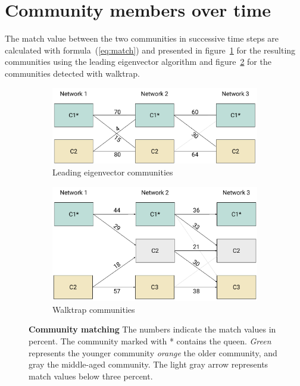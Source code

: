 \clearpage

\section{Community members over time}
The match value between the two communities in successive time steps are calculated with formula~(\ref{eq:match}) and presented in figure~\ref{fig:membersLE} for the resulting communities using the leading eigenvector algorithm and figure~\ref{fig:membersWT} for the communities detected with walktrap.

\begin{figure}[htb]
	\centering
	\begin{subfigure}[b]{1.0\textwidth}
	\centering
	\includegraphics[width=.8\textwidth]{Figures/membersLE}
	\caption[Leading eigenvector communities]{Leading eigenvector communities}
	\label{fig:membersLE}
	\vspace*{5mm}
	\end{subfigure} 
	\begin{subfigure}[b]{1.0\textwidth}
	\centering
	\includegraphics[width=.8\textwidth]{Figures/membersWT}
	\caption[Walktrap communities]{Walktrap communities}
	\label{fig:membersWT}
	\vspace*{5mm}
	\end{subfigure}
	\caption[Community matching]{\textbf{Community matching} The numbers indicate the match values in percent. The community marked with * contains the queen. \emph{Green} represents the younger community \emph{orange} the older community, and gray the middle-aged community. The light gray arrow represents match values below three percent.}
	\label{fig:members}
\end{figure}